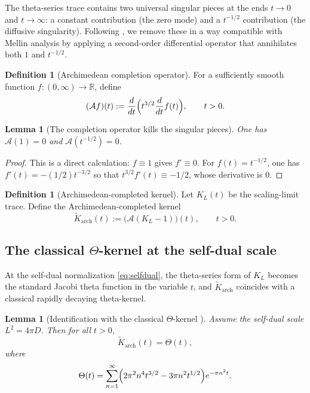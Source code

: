\documentclass[11pt]{amsart}
\newtheorem{lemma}[theorem]{Lemma}
\theoremstyle{definition}
\newtheorem{definition}[theorem]{Definition}
\theoremstyle{remark}
\newcommand{\R}{\mathbb{R}}
\begin{document}
The theta-series trace contains two universal singular pieces at the ends $t\to 0$ and $t\to\infty$:
a constant contribution (the zero mode) and a $t^{-1/2}$ contribution (the diffusive singularity).
Following \cite{PaperI}, we remove these in a way compatible with Mellin analysis by applying a
second-order differential operator that annihilates both $1$ and $t^{-1/2}$.

\begin{definition}[Archimedean completion operator]
\label{def:arch-operator}
For a sufficiently smooth function $f:(0,\infty)\to\R$, define
\begin{equation}\label{eq:arch-operator}
(\mathcal A f)(t):=\frac{d}{dt}\Bigl(t^{3/2}\frac{d}{dt}f(t)\Bigr),\qquad t>0.
\end{equation}
\end{definition}

\begin{lemma}[The completion operator kills the singular pieces]
\label{lem:A-kills-singular}
One has \(\mathcal A(1)=0\) and \(\mathcal A(t^{-1/2})=0\).
\end{lemma}

\begin{proof}
This is a direct calculation: $f\equiv 1$ gives $f'\equiv 0$.  For $f(t)=t^{-1/2}$,
one has $f'(t)=-(1/2)t^{-3/2}$ so that $t^{3/2}f'(t)\equiv -1/2$, whose derivative is $0$.
\end{proof}

\begin{definition}[Archimedean-completed kernel]
\label{def:arch-theta-kernel}
Let $K_L(t)$ be the scaling-limit trace.  Define the Archimedean-completed kernel
\[
\widetilde K_{\mathrm{arch}}(t) :=\bigl(\mathcal{A}(K_L-1)\bigr)(t),\qquad t>0.
\]
\end{definition}

\subsection{The classical $\Theta$-kernel at the self-dual scale}

At the self-dual normalization \eqref{eq:selfdual}, the theta-series form of $K_L$ becomes the
standard Jacobi theta function in the variable $t$, and $\widetilde K_{\mathrm{arch}}$ coincides with
a classical rapidly decaying theta-kernel.

\begin{lemma}[Identification with the classical $\Theta$-kernel {\cite[Lemma~Y]{PaperI}}]
\label{lem:arch-equals-Theta}
Assume the self-dual scale $L^2=4\pi D$. Then for all $t>0$,
\[
\widetilde K_{\mathrm{arch}}(t)=\Theta(t),
\]
where
\[
\Theta(t)=\sum_{n=1}^{\infty}\Bigl(2\pi^2 n^4 t^{3/2}-3\pi n^2 t^{1/2}\Bigr)e^{-\pi n^2 t}.
\]
\end{lemma}
\end{document}
